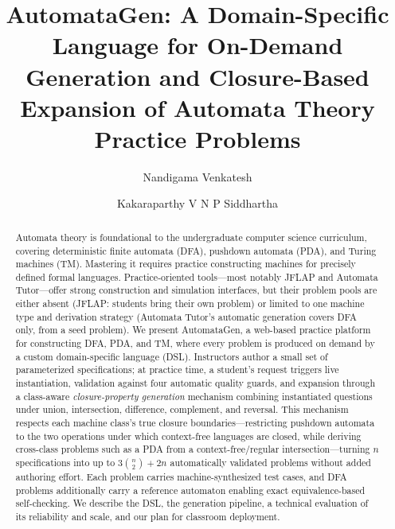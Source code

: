 \documentclass[sigconf]{acmart}
\begin{document}
\title{AutomataGen: A Domain-Specific Language for On-Demand Generation and Closure-Based Expansion of Automata Theory Practice Problems}

\author{Nandigama Venkatesh}
\author{Kakaraparthy V N P Siddhartha}

\renewcommand{\shortauthors}{Venkatesh and Siddhartha}

\begin{abstract}
Automata theory is foundational to the undergraduate computer science curriculum, 
covering deterministic finite automata (DFA), pushdown automata (PDA), and Turing machines (TM). 
Mastering it requires practice constructing machines for precisely defined formal languages. 
Practice-oriented tools---most notably JFLAP and Automata Tutor---offer strong construction and 
simulation interfaces, but their problem pools are either absent (JFLAP: students bring their own problem) or 
limited to one machine type and derivation strategy (Automata Tutor's automatic generation covers DFA only, 
from a seed problem). We present AutomataGen, a web-based practice platform for constructing DFA, PDA, and TM, 
where every problem is produced on demand by a custom domain-specific language (DSL). 
Instructors author a small set of parameterized specifications; at practice time, 
a student's request triggers live instantiation, validation against four automatic quality guards, 
and expansion through a class-aware \emph{closure-property generation} mechanism combining instantiated questions 
under union, intersection, difference, complement, and reversal. 
This mechanism respects each machine class's true closure boundaries---restricting pushdown automata to 
the two operations under which context-free languages are closed, while deriving cross-class problems 
such as a PDA from a context-free/regular intersection---turning $n$ specifications into up to 
$3\binom{n}{2}+2n$ automatically validated problems without added authoring effort. 
Each problem carries machine-synthesized test cases, and DFA problems additionally carry a 
reference automaton enabling exact equivalence-based self-checking. 
We describe the DSL, the generation pipeline, a technical evaluation of its reliability and scale, 
and our plan for classroom deployment.
\end{abstract}
\end{document}
